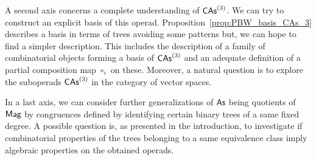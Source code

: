 
A second axis concerns a complete understanding of $\mathsf{CAs}^{\left(3\right)}$. We can
try to construct an explicit basis of this operad.
Proposition~\ref{prop:PBW_basis_CAs_3} describes a basis in terms of
trees avoiding some patterns but, we can hope to find a simpler
description. This includes the description of a family of combinatorial
objects forming a basis of $\mathsf{CAs}^{\left(3\right)}$ and an adequate definition of a
partial composition map $\circ_i$ on these. Moreover, a natural
question is to explore the suboperads $\mathsf{CAs}^{\left(3\right)}$ in the category of
vector spaces.
\medbreak

In a last axis, we can consider further generalizations of $\mathsf{As}$ being
quotients of $\mathsf{Mag}$ by congruences defined by identifying certain binary
trees of a same fixed degree. A possible question is, as presented in
the introduction, to investigate if combinatorial properties of the
trees belonging to a same equivalence class imply algebraic properties
on the obtained operads.
\medbreak
